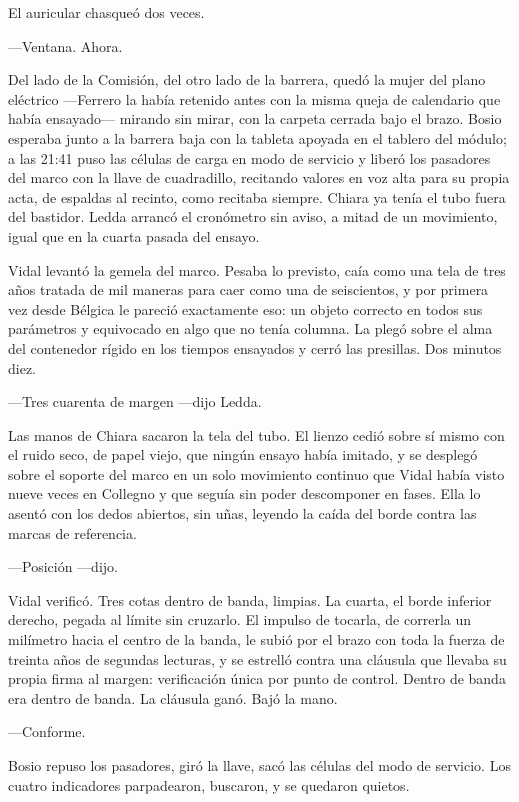 El auricular chasqueó dos veces.

---Ventana. Ahora.

Del lado de la Comisión, del otro lado de la barrera, quedó la mujer del plano eléctrico ---Ferrero la había retenido antes con la misma queja de calendario que había ensayado--- mirando sin mirar, con la carpeta cerrada bajo el brazo. Bosio esperaba junto a la barrera baja con la tableta apoyada en el tablero del módulo; a las 21:41 puso las células de carga en modo de servicio y liberó los pasadores del marco con la llave de cuadradillo, recitando valores en voz alta para su propia acta, de espaldas al recinto, como recitaba siempre. Chiara ya tenía el tubo fuera del bastidor. Ledda arrancó el cronómetro sin aviso, a mitad de un movimiento, igual que en la cuarta pasada del ensayo.

Vidal levantó la gemela del marco. Pesaba lo previsto, caía como una tela de tres años tratada de mil maneras para caer como una de seiscientos, y por primera vez desde Bélgica le pareció exactamente eso: un objeto correcto en todos sus parámetros y equivocado en algo que no tenía columna. La plegó sobre el alma del contenedor rígido en los tiempos ensayados y cerró las presillas. Dos minutos diez.

---Tres cuarenta de margen ---dijo Ledda.

Las manos de Chiara sacaron la tela del tubo. El lienzo cedió sobre sí mismo con el ruido seco, de papel viejo, que ningún ensayo había imitado, y se desplegó sobre el soporte del marco en un solo movimiento continuo que Vidal había visto nueve veces en Collegno y que seguía sin poder descomponer en fases. Ella lo asentó con los dedos abiertos, sin uñas, leyendo la caída del borde contra las marcas de referencia.

---Posición ---dijo.

Vidal verificó. Tres cotas dentro de banda, limpias. La cuarta, el borde inferior derecho, pegada al límite sin cruzarlo. El impulso de tocarla, de correrla un milímetro hacia el centro de la banda, le subió por el brazo con toda la fuerza de treinta años de segundas lecturas, y se estrelló contra una cláusula que llevaba su propia firma al margen: verificación única por punto de control. Dentro de banda era dentro de banda. La cláusula ganó. Bajó la mano.

---Conforme.

Bosio repuso los pasadores, giró la llave, sacó las células del modo de servicio. Los cuatro indicadores parpadearon, buscaron, y se quedaron quietos.

